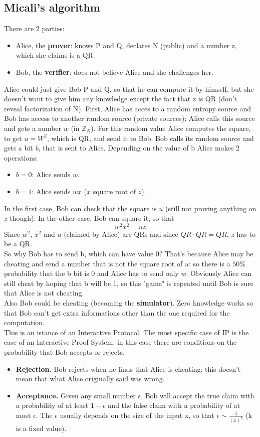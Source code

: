 \documentclass[a4paper, 10pt, titlepage]{article}
\begin{document}
\subsection{Micali's algorithm}
There are 2 parties:
\begin{itemize}
\item Alice, the \textbf{prover}: knows P and Q, declares N (public) and a number z, which she claims is a QR.
\item Bob, the \textbf{verifier}: does not believe Alice and she challenges her.
\end{itemize}
Alice could just give Bob P and Q, so that he can compute it by himself, but she doesn't want to give him any knowledge except the fact that z is QR (don't reveal factorization of N). First, Alice has acces to a random entropy source and Bob has access to another random source (private sources); Alice calls this source and gets a number $w$ (in $\mathbb{Z}_N$). For this random value Alice computes the square, to get $u = W^2$, which is QR, and send it to Bob. Bob calls its random source and gets a bit \textit{b}, that is sent to Alice.
Depending on the value of b Alice makes 2 operations:
\begin{itemize}
\item $b=0$: Alice sends $w$. 
\item $b=1$: Alice sends $wx$ ($x$ square root of $z$).
\end{itemize}
In the first case, Bob can check that the square is $u$ (still not proving anything on $z$ though).
In the other case, Bob can square it, so that
$$w^2x^2 = uz$$
Since $w^2$, $x^2$ and $u$ (claimed by Alice) are QRs and since $QR \cdot QR = QR$, $z$ has to be a QR.\\
So why Bob has to send b, which can have value 0? That's because Alice may be cheating and send a number that is not the square root of $u$: so there is a $50\%$ probability that the b bit is 0 and Alice has to send only $w$. Obviously Alice can still cheat by hoping that b will be 1, so this "game" is repeated until Bob is sure that Alice is not cheating. \\
Also Bob could be cheating (becoming the \textbf{simulator}). Zero knowledge works so that Bob can't get extra informations other than the one required for the computation. \medskip\\
This is an istance of an Interactive Protocol. The most specific case of IP is the case of an Interactive Proof System: in this case there are conditions on the probability that Bob accepts or rejects.
\begin{itemize}
\item \textbf{Rejection.} Bob rejects when he finds that Alice is cheating: this doesn't mean that what Alice originally said was wrong.
\item \textbf{Acceptance.} Given any small number $\epsilon$, Bob will accept the true claim with a probability of at least $1 - \epsilon$ and the false claim with a probability of at most $\epsilon$. The $\epsilon$ usually depends on the size of the input x, so that $\epsilon \sim \frac{1}{(x)^k}$ (k is a fixed value).
\end{itemize}
\end{document}
